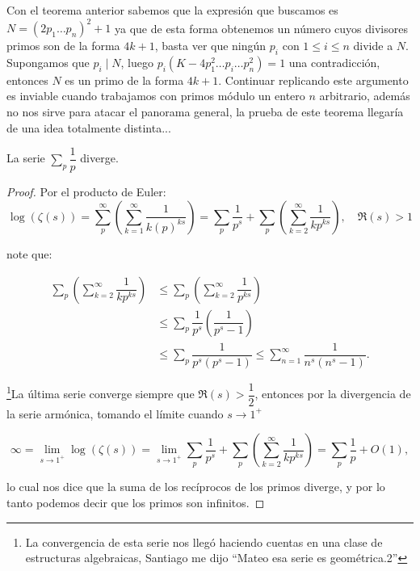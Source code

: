 Con el teorema anterior sabemos que la expresión que buscamos es $N=(2p_1\ldots p_n)^2+1$ ya que de esta forma obtenemos un número cuyos divisores primos son de la forma $4k+1$, basta ver que ningún $p_i$ con $1\leq i\leq n$ divide a $N$.\\

Supongamos que $p_i\mid N$, luego $p_i(K-4p_1^2\ldots p_i\ldots p_n^2)=1$ una contradicción, entonces $N$ es un primo de la forma $4k+1$. Continuar replicando este argumento es inviable cuando trabajamos con primos módulo un entero $n$ arbitrario, además no nos sirve para atacar el panorama general, la prueba de este teorema llegaría de una idea totalmente distinta...


\begin{theorem}[Euler]
La serie $\displaystyle\sum_p \dfrac{1}{p}$ diverge.
\end{theorem}

\begin{proof}
Por el producto de Euler:
    $$
\log (\zeta(s))=\sum_p^{\infty}\left(\displaystyle\sum_{k=1}^{\infty} \dfrac{1}{k(p)^{k s}}\right)=\sum_p
\dfrac{1}{p^s}+\sum_{p}\left(\sum_{k=2}^{\infty}\dfrac{1}{kp^{ks}}\right), \quad \Re(s)>1$$

note que:

\begin{align*}
    \sum_{p}\left(\sum_{k=2}^{\infty}\dfrac{1}{kp^{ks}}\right)&\leq \sum_{p}\left(\sum_{k=2}^{\infty}\dfrac{1}{p^{ks}}\right)\\
    &\leq\sum_{p}\dfrac{1}{p^s}\left(\dfrac{1}{p^s-1}\right)\\
    &\leq \sum_{p}\dfrac{1}{p^s(p^s-1)}\leq \sum_{n=1}^{\infty}\dfrac{1}{n^s(n^s-1)}.
\end{align*}

\footnote{La convergencia de esta serie nos llegó haciendo cuentas en una clase de estructuras algebraicas, Santiago me dijo ``Mateo esa serie es geométrica.2''}La última serie converge siempre que $\Re(s)>\dfrac{1}{2}$, entonces por la divergencia de la serie armónica, tomando el límite cuando $s\to 1^+$

$$
\infty=\lim_{s\to 1^+}\log(\zeta(s))=\lim_{s\to 1^+}\sum_p
\dfrac{1}{p^s}+\sum_{p}\left(\sum_{k=2}^{\infty}\dfrac{1}{kp^{ks}}\right)=\sum_p
\dfrac{1}{p}+ O(1),$$

lo cual nos dice que la suma de los recíprocos de los primos diverge, y por lo tanto podemos decir que los primos son infinitos. 
\end{proof}

